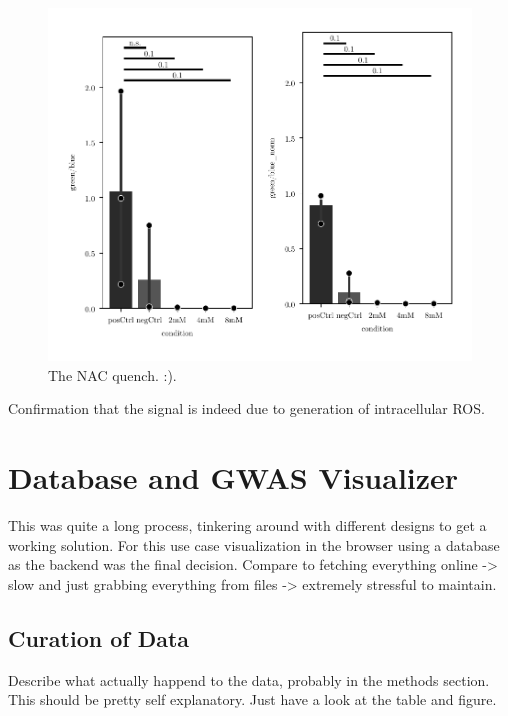     \begin{figure}[h]
    \capstart
        \centering
    	\includegraphics{Abbildung/NAC_quench.pdf}

    	\begin{minipage}{\captionwidth}
    		\caption[NAC quench]{ \newline The NAC quench. :).}
    		\label{fig:qPCR}
    	\end{minipage}
    \end{figure}

    Confirmation that the signal is indeed due to generation of intracellular ROS.

\section{Database and GWAS Visualizer}
This was quite a long process, tinkering around with different designs to get a working solution. For this use case visualization in the browser using a database as the backend was the final decision. Compare to fetching everything online -> slow and just grabbing everything from files -> extremely stressful to maintain.

    \subsection{Curation of Data}
    Describe what actually happend to the data, probably in the methods section.
    This should be pretty self explanatory. Just have a look at the table and figure. 

